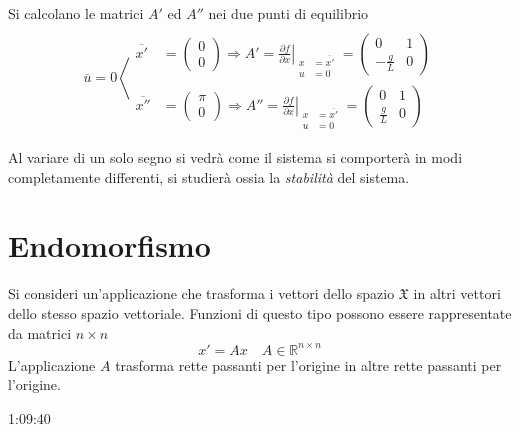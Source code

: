 Si calcolano le matrici $A'$ ed $A''$ nei due punti di equilibrio
$$
\overline{u} = 0 \left\langle
\begin{aligned}
 \\
 \overline{x'} &= \begin{pmatrix}
                  0 \\ 0
                 \end{pmatrix} \Rightarrow
                 A' = \left.\frac{\partial f}{\partial x}
                            \right|_{\begin{aligned}
                                      x &= \overline{x'}\\
                                      u &= 0
                                     \end{aligned}} =
                                     \begin{pmatrix}
                                      0 & 1 \\
                                      -\frac{g}{L} & 0
                                     \end{pmatrix}
\\
 \overline{x''} &= \begin{pmatrix}
                   \pi \\ 0
                  \end{pmatrix} \Rightarrow
                 A'' = \left.\frac{\partial f}{\partial x}
                            \right|_{\begin{aligned}
                                      x &= \overline{x'}\\
                                      u &= 0
                                     \end{aligned}} =
                                     \begin{pmatrix}
                                      0 & 1 \\
                                      \frac{g}{L} & 0
                                     \end{pmatrix}
\end{aligned} \right.
$$

Al variare di un solo segno si vedrà come il sistema si comporterà in modi
completamente differenti, si studierà ossia la \textit{stabilità} del sistema.

\section{Endomorfismo}
Si consideri un'applicazione che trasforma i vettori dello spazio
$\mathfrak{X}$ in altri vettori dello stesso spazio vettoriale.
Funzioni di questo tipo possono essere rappresentate da matrici $n\times n$
$$
x' = Ax\quad A\in\mathbb{R}^{n\times n}
$$
L'applicazione $A$ trasforma rette passanti per l'origine in altre rette
passanti per l'origine.

1:09:40
